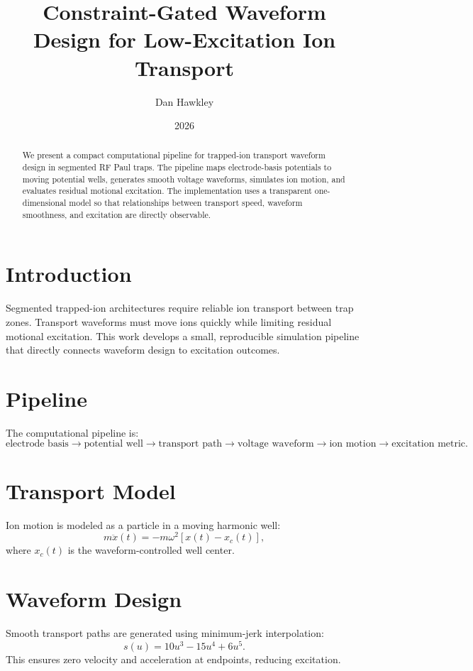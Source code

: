 \documentclass[11pt]{article}
\title{Constraint-Gated Waveform Design for Low-Excitation Ion Transport}
\author{Dan Hawkley}
\date{2026}
\begin{document}
\maketitle

\begin{abstract}
We present a compact computational pipeline for trapped-ion transport waveform design in segmented RF Paul traps. The pipeline maps electrode-basis potentials to moving potential wells, generates smooth voltage waveforms, simulates ion motion, and evaluates residual motional excitation. The implementation uses a transparent one-dimensional model so that relationships between transport speed, waveform smoothness, and excitation are directly observable.
\end{abstract}

\section{Introduction}

Segmented trapped-ion architectures require reliable ion transport between trap zones. Transport waveforms must move ions quickly while limiting residual motional excitation. This work develops a small, reproducible simulation pipeline that directly connects waveform design to excitation outcomes.

\section{Pipeline}

The computational pipeline is:
\[
\text{electrode basis}
\rightarrow
\text{potential well}
\rightarrow
\text{transport path}
\rightarrow
\text{voltage waveform}
\rightarrow
\text{ion motion}
\rightarrow
\text{excitation metric}.
\]

\section{Transport Model}

Ion motion is modeled as a particle in a moving harmonic well:
\[
m\ddot{x}(t) = -m\omega^2[x(t)-x_c(t)],
\]
where \(x_c(t)\) is the waveform-controlled well center.

\section{Waveform Design}

Smooth transport paths are generated using minimum-jerk interpolation:
\[
s(u)=10u^3-15u^4+6u^5.
\]
This ensures zero velocity and acceleration at endpoints, reducing excitation.
\end{document}
